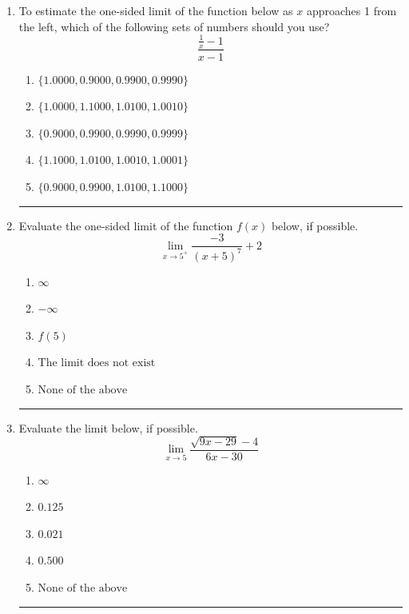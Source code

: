 \documentclass[14pt]{extbook}
\newcommand{\litem}[1]{\item#1\hspace*{-1cm}\rule{\textwidth}{0.4pt}}
\begin{document}
\begin{enumerate}
{\begin{enumerate}[label=\Alph*.]
\end{enumerate} }
\litem{
To estimate the one-sided limit of the function below as $x$ approaches 1 from the left, which of the following sets of numbers should you use?\[ \frac{\frac{1}{x} - 1}{x - 1} \]\begin{enumerate}[label=\Alph*.]
\item \( \{ 1.0000, 0.9000, 0.9900, 0.9990 \} \)
\item \( \{ 1.0000, 1.1000, 1.0100, 1.0010 \} \)
\item \( \{ 0.9000, 0.9900, 0.9990, 0.9999 \} \)
\item \( \{ 1.1000, 1.0100, 1.0010, 1.0001 \} \)
\item \( \{ 0.9000, 0.9900, 1.0100, 1.1000 \} \)

\end{enumerate} }
\litem{
Evaluate the one-sided limit of the function $f(x)$ below, if possible.\[ \lim_{x \rightarrow 5^+} \frac{-3}{(x+5)^7}+2 \]\begin{enumerate}[label=\Alph*.]
\item \( \infty \)
\item \( -\infty \)
\item \( f(5) \)
\item \( \text{The limit does not exist} \)
\item \( \text{None of the above} \)

\end{enumerate} }
\litem{
Evaluate the limit below, if possible.\[ \lim_{x \rightarrow 5} \frac{\sqrt{9x - 29} - 4}{6x - 30} \]\begin{enumerate}[label=\Alph*.]
\item \( \infty \)
\item \( 0.125 \)
\item \( 0.021 \)
\item \( 0.500 \)
\item \( \text{None of the above} \)


\end{enumerate}}
\end{enumerate}
\end{document}
